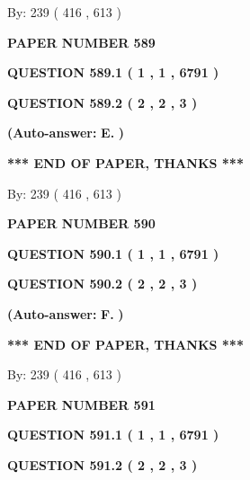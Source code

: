 \documentclass[12pt]{article}
\begin{document}
   
\hspace{1.0in} By: 
 239 ( 416 ,  613 )
   
   
   
   
\newpage 
\setcounter{page}{ 
   589001 } 
   
   
 {\textbf{ \Large{ PAPER NUMBER  589  }}}
   
   
   
   
  
  
{\textbf{\large{QUESTION
589.1 
 ( 1 , 1 , 6791 )
}}}
  
  
{\textbf{\large{QUESTION
589.2 
 ( 2 , 2 , 3 )
}}}
 
 
{\textbf{(Auto-answer:}}
{\textbf{\large{
E.}}}
{\textbf{)}}
 
 
   
   
   
   
\vspace{1.0in} 
{\textbf{\large{ *** END OF PAPER, THANKS *** }}} 
   
   
\hspace{1.0in} By: 
 239 ( 416 ,  613 )
   
   
   
   
\newpage 
\setcounter{page}{ 
   590001 } 
   
   
 {\textbf{ \Large{ PAPER NUMBER  590  }}}
   
   
   
   
  
  
{\textbf{\large{QUESTION
590.1 
 ( 1 , 1 , 6791 )
}}}
  
  
{\textbf{\large{QUESTION
590.2 
 ( 2 , 2 , 3 )
}}}
 
 
{\textbf{(Auto-answer:}}
{\textbf{\large{
F.}}}
{\textbf{)}}
 
 
   
   
   
   
\vspace{1.0in} 
{\textbf{\large{ *** END OF PAPER, THANKS *** }}} 
   
   
\hspace{1.0in} By: 
 239 ( 416 ,  613 )
   
   
   
   
\newpage 
\setcounter{page}{ 
   591001 } 
   
   
 {\textbf{ \Large{ PAPER NUMBER  591  }}}
   
   
   
   
  
  
{\textbf{\large{QUESTION
591.1 
 ( 1 , 1 , 6791 )
}}}
  
  
{\textbf{\large{QUESTION
591.2 
 ( 2 , 2 , 3 )
}}}
 
\end{document}
